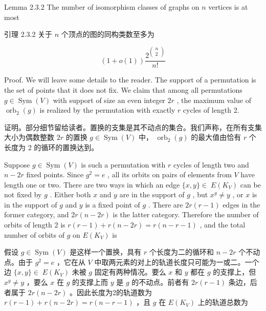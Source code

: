 \documentclass[10pt]{article}
\begin{document}
Lemma 2.3.2 The number of isomorphism classes of graphs on \(n\) vertices is at most

\begin{tcolorbox}\relax
引理 2.3.2 关于 \(n\) 个顶点的图的同构类数至多为
\end{tcolorbox}

\[
\left( {1 + o\left( 1\right) }\right) \frac{{2}^{\left( \begin{matrix} n \\  2 \end{matrix}\right) }}{n!}
\]

Proof. We will leave some details to the reader. The support of a permutation is the set of points that it does not fix. We claim that among all permutations \(g \in  \operatorname{Sym}\left( V\right)\) with support of size an even integer \({2r}\) , the maximum value of \({\operatorname{orb}}_{2}\left( g\right)\) is realized by the permutation with exactly \(r\) cycles of length 2.

\begin{tcolorbox}\relax
证明。部分细节留给读者。置换的支集是其不动点的集合。我们声称，在所有支集大小为偶数整数 \({2r}\) 的置换 \(g \in  \operatorname{Sym}\left( V\right)\) 中， \({\operatorname{orb}}_{2}\left( g\right)\) 的最大值由恰有 \(r\) 个长度为 2 的循环的置换达到。
\end{tcolorbox}

Suppose \(g \in  \operatorname{Sym}\left( V\right)\) is such a permutation with \(r\) cycles of length two and \(n - {2r}\) fixed points. Since \({g}^{2} = e\) , all its orbits on pairs of elements from \(V\) have length one or two. There are two ways in which an edge \(\{ x,y\}  \in \; E\left( {K}_{V}\right)\) can be not fixed by \(g\) . Either both \(x\) and \(y\) are in the support of \(g\) , but \({x}^{g} \neq  y\) , or \(x\) is in the support of \(g\) and \(y\) is a fixed point of \(g\) . There are \({2r}\left( {r - 1}\right)\) edges in the former category, and \({2r}\left( {n - {2r}}\right)\) is the latter category. Therefore the number of orbits of length 2 is \(r\left( {r - 1}\right)  + r\left( {n - {2r}}\right)  = r\left( {n - r - 1}\right)\) , and the total number of orbits of \(g\) on \(E\left( {K}_{V}\right)\) is

\begin{tcolorbox}\relax
假设 \(g \in  \operatorname{Sym}\left( V\right)\) 是这样一个置换，具有 \(r\) 个长度为二的循环和 \(n - {2r}\) 个不动点。由于 \({g}^{2} = e\) ，它在从 \(V\) 中取两元素的对上的轨道长度只可能为一或二。一个边 \(\{ x,y\}  \in \; E\left( {K}_{V}\right)\) 未被 \(g\) 固定有两种情况。要么 \(x\) 和 \(y\) 都在 \(g\) 的支撑上，但 \({x}^{g} \neq  y\) ，要么 \(x\) 在 \(g\) 的支撑上而 \(y\) 是 \(g\) 的不动点。前者有 \({2r}\left( {r - 1}\right)\) 条边，后者属于 \({2r}\left( {n - {2r}}\right)\) 。因此长度为2的轨道数为 \(r\left( {r - 1}\right)  + r\left( {n - {2r}}\right)  = r\left( {n - r - 1}\right)\) ，且 \(g\) 在 \(E\left( {K}_{V}\right)\) 上的轨道总数为
\end{tcolorbox}
\end{document}
